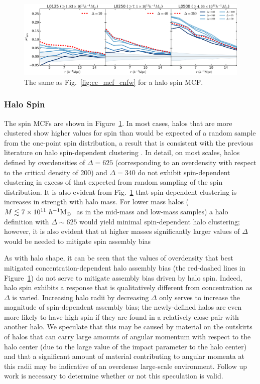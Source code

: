 \documentclass[usenatbib,fleqn]{mnras}
\begin{document}
\begin{figure}
	\centering
	\includegraphics[width=\textwidth]{all_mcf_spin.pdf}
	\caption{
The same as Fig.~\ref{fig:cc_mcf_cnfw} for a halo spin MCF.
}
	\label{fig:cc_mcf_spin}
\end{figure}

\subsubsection{Halo Spin}

The spin MCFs are shown in Figure~\ref{fig:cc_mcf_spin}. In most cases, halos that are more clustered show higher values for spin than would be expected of a random sample from the one-point spin distribution, a result that is consistent with the previous literature on halo spin-dependent clustering \citep{bett_etal07,faltenbacher_white10,lacerna_padilla12}. In detail, on most scales, halos defined by overdensities of $\Delta=625$ (corresponding to an overdensity with respect to the critical density of 200) and $\Delta=340$ do not exhibit spin-dependent clustering in excess of that expected from random sampling of the spin distribution. It is also evident from Fig.~\ref{fig:cc_mcf_spin} that spin-dependent clustering is increases in strength with halo mass. For lower mass halos ($M \lesssim 7 \times 10^{11} \ h^{-1}\mathrm{M}_{\odot}~$ as in the mid-mass and low-mass samples) a halo definition with $\Delta \sim 625$ would yield minimal spin-dependent halo clustering; however, it is also evident that at higher masses significantly larger values of $\Delta$ would be needed to mitigate spin assembly bias\citep{hahn_etal07a,hahn_etal07b,faltenbacher_white10}

As with halo shape, it can be seen that the values of overdensity that best mitigated concentration-dependent halo assembly bias (the red-dashed lines in Figure~\ref{fig:cc_mcf_spin}) do not serve to mitigate assembly bias driven by halo spin. Indeed, halo spin exhibits a response that is qualitatively different from concentration as $\Delta$ is varied. Increasing halo radii by decreasing $\Delta$ only serves to increase the magnitude of spin-dependent assembly bias; the newly-defined halos are even more likely to have high spin if they are found in a relatively close pair with another halo. We speculate that this may be caused by material on the outskirts of halos that can carry large amounts of angular momentum with respect to the halo center (due to the large value of the impact parameter to the halo center) and that a significant amount of material contributing to angular momenta at this radii may be indicative of an overdense large-scale environment. Follow up work is necessary to determine whether or not this speculation is valid.
\end{document}
